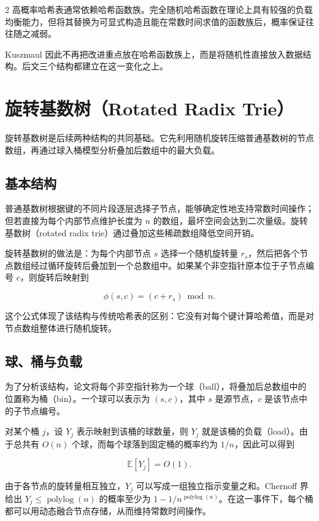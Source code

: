 \documentclass[10.5pt,compsoc,UTF8]{CjC}
\theoremstyle{mystyle}
\begin{document}
\begin{multicols}{2}
高概率哈希表通常依赖哈希函数族。完全随机哈希函数在理论上具有较强的负载均衡能力，但将其替换为可显式构造且能在常数时间求值的函数族后，概率保证往往随之减弱。

Kuszmaul 因此不再把改进重点放在哈希函数族上，而是将随机性直接放入数据结构。后文三个结构都建立在这一变化之上。

\section{\heiti 旋转基数树（Rotated Radix Trie）}

旋转基数树是后续两种结构的共同基础。它先利用随机旋转压缩普通基数树的节点数组，再通过球入桶模型分析叠加后数组中的最大负载。

\subsection{\heiti 基本结构}

普通基数树根据键的不同片段逐层选择子节点，能够确定性地支持常数时间操作；但若直接为每个内部节点维护长度为 $n$ 的数组，最坏空间会达到二次量级。旋转基数树（rotated radix trie）通过叠加这些稀疏数组降低空间开销。

旋转基数树的做法是：为每个内部节点 $s$ 选择一个随机旋转量 $r_s$，然后把各个节点数组经过循环旋转后叠加到一个总数组中。如果某个非空指针原本位于子节点编号 $c$，则旋转后映射到

\begin{equation}
\phi(s,c)=(c+r_s)\bmod n .
\end{equation}

这个公式体现了该结构与传统哈希表的区别：它没有对每个键计算哈希值，而是对节点数组整体进行随机旋转。

\subsection{\heiti 球、桶与负载}

为了分析该结构，论文将每个非空指针称为一个球（ball），将叠加后总数组中的位置称为桶（bin）。一个球可以表示为 $(s,c)$，其中 $s$ 是源节点，$c$ 是该节点中的子节点编号。

对某个桶 $j$，设 $Y_j$ 表示映射到该桶的球数量，则 $Y_j$ 就是该桶的负载（load）。由于总共有 $O(n)$ 个球，而每个球落到固定桶的概率约为 $1/n$，因此可以得到

\begin{equation}
\mathbb{E}[Y_j]=O(1).
\end{equation}

由于各节点的旋转量相互独立，$Y_j$ 可以写成一组独立指示变量之和。Chernoff 界给出 $Y_j\leq \operatorname{polylog}(n)$ 的概率至少为 $1-1/n^{\operatorname{polylog}(n)}$。在这一事件下，每个桶都可以用动态融合节点存储，从而维持常数时间操作。


\end{multicols}
\end{document}
